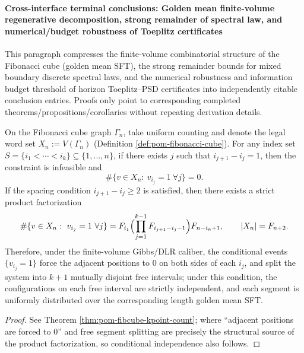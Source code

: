 
\paragraph{Cross-interface terminal conclusions: Golden mean finite-volume regenerative decomposition, strong remainder of spectral law, and numerical/budget robustness of Toeplitz certificates}
This paragraph compresses the finite-volume combinatorial structure of the Fibonacci cube (golden mean SFT), the strong remainder bounds for mixed boundary discrete spectral laws, and the numerical robustness and information budget threshold of horizon Toeplitz--PSD certificates into independently citable conclusion entries.
Proofs only point to corresponding completed theorems/propositions/corollaries without repeating derivation details.

\begin{conclusion}\label{con:xi-terminal-golden-mean-dlr-regeneration-factorization}
On the Fibonacci cube graph \(\Gamma_n\), take uniform counting and denote the legal word set \(X_n:=V(\Gamma_n)\) (Definition \ref{def:pom-fibonacci-cube}).
For any index set \(S=\{i_1<\cdots<i_k\}\subseteq\{1,\dots,n\}\), if there exists \(j\) such that \(i_{j+1}-i_j=1\), then the constraint is infeasible and
\[
\#\{v\in X_n:\ v_{i_j}=1\ \forall j\}=0.
\]
If the spacing condition \(i_{j+1}-i_j\ge 2\) is satisfied, then there exists a strict product factorization
\[
\#\{v\in X_n:\ v_{i_j}=1\ \forall j\}
=F_{i_1}\Bigl(\prod_{j=1}^{k-1}F_{i_{j+1}-i_j-1}\Bigr)F_{n-i_k+1},
\qquad |X_n|=F_{n+2}.
\]
Therefore, under the finite-volume Gibbs/DLR caliber, the conditional events \(\{v_{i_j}=1\}\) force the adjacent positions to \(0\) on both sides of each \(i_j\), and split the system into \(k+1\) mutually disjoint free intervals;
under this condition, the configurations on each free interval are strictly independent, and each segment is uniformly distributed over the corresponding length golden mean SFT.
\end{conclusion}
\begin{proof}
See Theorem \ref{thm:pom-fibcube-kpoint-count}; where ``adjacent positions are forced to \(0\)'' and free segment splitting are precisely the structural source of the product factorization, so conditional independence also follows.
\end{proof}

